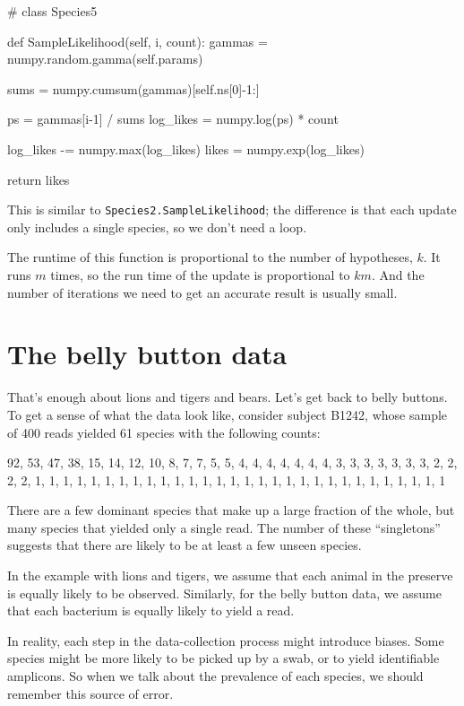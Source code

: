 \documentclass[12pt]{book}
\theoremstyle{exercise}
\begin{document}
\begin{code}
# class Species5

    def SampleLikelihood(self, i, count):
        gammas = numpy.random.gamma(self.params)

        sums = numpy.cumsum(gammas)[self.ns[0]-1:]

        ps = gammas[i-1] / sums
        log_likes = numpy.log(ps) * count

        log_likes -= numpy.max(log_likes)
        likes = numpy.exp(log_likes)

        return likes
\end{code}

This is similar to {\tt Species2.SampleLikelihood}; the
difference is that each update only includes a single species,
so we don't need a loop.

The runtime of this function is proportional to the number
of hypotheses, $k$.  It runs $m$ times, so the run time of
the update is proportional to $k m$.
And the number of iterations we
need to get an accurate result is usually small.


\section{The belly button data}
\label{belly}

That's enough about lions and tigers and bears.
Let's get back to belly buttons.  To get a sense of what the
data look like, consider subject B1242,
whose sample of 400 reads yielded 61 species with the following
counts:

\begin{code}
92, 53, 47, 38, 15, 14, 12, 10, 8, 7, 7, 5, 5, 
4, 4, 4, 4, 4, 4, 4, 3, 3, 3, 3, 3, 3, 3, 2, 2, 2, 2,
1, 1, 1, 1, 1, 1, 1, 1, 1, 1, 1, 1, 1, 1, 1, 1, 1, 1,
1, 1, 1, 1, 1, 1, 1, 1, 1, 1, 1, 1
\end{code}

There are a few dominant species that make up a large
fraction of the whole, but many species that yielded only
a single read.  The number of these ``singletons'' suggests
that there are likely to be at least a few unseen species.

In the example with lions and tigers, we assume that each
animal in the preserve is equally likely to be observed.
Similarly, for the belly button data, we assume that each
bacterium is equally likely to yield a read.

In reality, each step in the data-collection
process might introduce biases.  Some species might
be more likely to be picked up by a swab, or to yield identifiable
amplicons.  So when we talk about the prevalence of each species,
we should remember this source of error.
\end{document}
